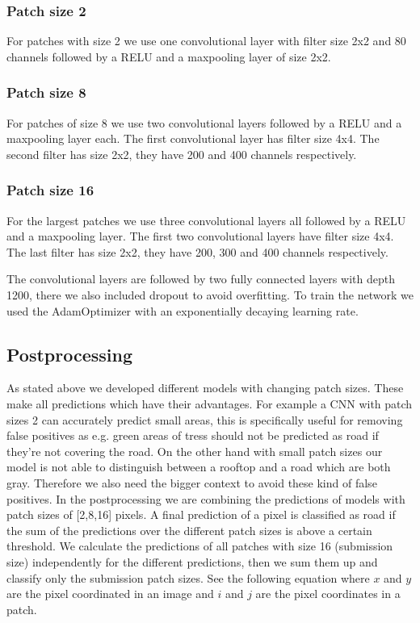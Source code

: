 \documentclass[10pt,conference,compsocconf]{IEEEtran}
\begin{document}
\subsubsection{Patch size 2}
	For patches with size 2 we use one convolutional layer with filter size 2x2 and 80 channels followed by a RELU and a maxpooling layer of size 2x2. 
\subsubsection{Patch size 8}
	For patches of size 8 we use two convolutional layers followed by a RELU and a maxpooling layer each. The first convolutional layer has filter size 4x4. The second filter has size 2x2, they have 200 and 400 channels respectively. 
\subsubsection{Patch size 16}
    For the largest patches we use three convolutional layers all followed by a RELU and a maxpooling layer. The first two convolutional layers have filter size 4x4. The last filter has size 2x2, they have 200, 300 and 400 channels respectively. 
    
The convolutional layers are followed by two fully connected layers with depth 1200, there we also included dropout to avoid overfitting. To train the network we used the AdamOptimizer \cite{adam} with an exponentially decaying learning rate.

    
\subsection{Postprocessing}
As stated above we developed different models with changing patch sizes. These make all predictions which have their advantages. For example a CNN with patch sizes 2 can accurately predict small areas, this is specifically useful for removing false positives as e.g. green areas of tress should not be predicted as road if they're not covering the road. On the other hand with small patch sizes our model is not able to distinguish between a rooftop and a road which are both gray. Therefore we also need the bigger context to avoid these kind of false positives. In the postprocessing we are combining the predictions of models with patch sizes of [2,8,16] pixels. A final prediction of a pixel is classified as road if the sum of the predictions over the different patch sizes is above a certain threshold. We calculate the predictions of all patches with size 16 (submission size) independently for the different predictions, then we sum them up and classify only the submission patch sizes. See the following equation where $x$ and $y$ are the pixel coordinated in an image and $i$ and $j$ are the pixel coordinates in a patch.
\end{document}
